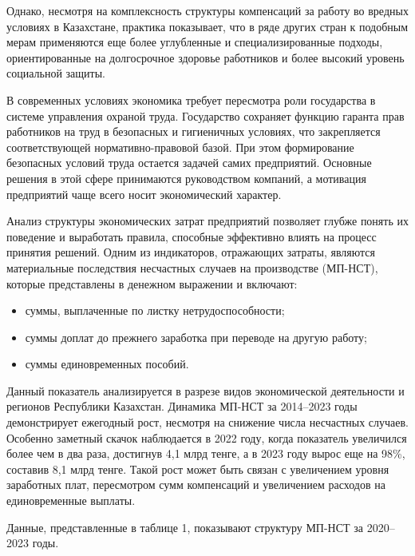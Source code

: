 \begin{multicols}{2}

Однако, несмотря на комплексность структуры компенсаций за работу во
вредных условиях в Казахстане, практика показывает, что в ряде других
стран к подобным мерам применяются еще более углубленные и
специализированные подходы, ориентированные на долгосрочное здоровье
работников и более высокий уровень социальной защиты.

В современных условиях экономика требует пересмотра роли государства в
системе управления охраной труда. Государство сохраняет функцию гаранта
прав работников на труд в безопасных и гигиеничных условиях, что
закрепляется соответствующей нормативно-правовой базой. При этом
формирование безопасных условий труда остается задачей самих
предприятий. Основные решения в этой сфере принимаются руководством
компаний, а мотивация предприятий чаще всего носит экономический
характер.

Анализ структуры экономических затрат предприятий позволяет глубже
понять их поведение и выработать правила, способные эффективно влиять на
процесс принятия решений. Одним из индикаторов, отражающих затраты,
являются материальные последствия несчастных случаев на производстве
(МП-НСТ), которые представлены в денежном выражении и включают:

\begin{itemize}
\item
  суммы, выплаченные по листку нетрудоспособности;
\item
  суммы доплат до прежнего заработка при переводе на другую работу;
\item
  суммы единовременных пособий.
\end{itemize}

Данный показатель анализируется в разрезе видов экономической
деятельности и регионов Республики Казахстан. Динамика МП-НСТ за
2014--2023 годы демонстрирует ежегодный рост, несмотря на снижение числа
несчастных случаев. Особенно заметный скачок наблюдается в 2022 году,
когда показатель увеличился более чем в два раза, достигнув 4,1 млрд
тенге, а в 2023 году вырос еще на 98\%, составив 8,1 млрд тенге. Такой
рост может быть связан с увеличением уровня заработных плат, пересмотром
сумм компенсаций и увеличением расходов на единовременные выплаты.

Данные, представленные в таблице 1, показывают структуру МП-НСТ за
2020--2023 годы.

\end{multicols}

